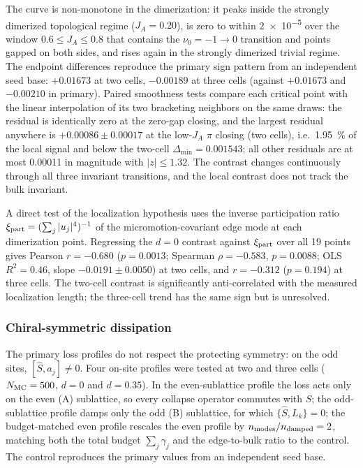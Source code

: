 \documentclass[aps,pra,preprint,superscriptaddress,amsmath,amssymb]{revtex4-2}
\begin{document}
The curve is non-monotone in the dimerization: it peaks inside the strongly dimerized topological regime ($J_A=\num{0.20}$), is zero to within \num{2e-5} over the window $\num{0.6}\le J_A\le\num{0.8}$ that contains the $\nu_0=-1\to0$ transition and points gapped on both sides, and rises again in the strongly dimerized trivial regime. The endpoint differences reproduce the primary sign pattern from an independent seed base: $+\num{0.01673}$ at two cells, $-\num{0.00189}$ at three cells (against $+\num{0.01673}$ and $-\num{0.00210}$ in primary). Paired smoothness tests compare each critical point with the linear interpolation of its two bracketing neighbors on the same draws: the residual is identically zero at the zero-gap closing, and the largest residual anywhere is $+\num{0.00086}\pm\num{0.00017}$ at the low-$J_A$ $\pi$ closing (two cells), i.e.\ \qty{1.95}{\percent} of the local signal and below the two-cell $\Delta_{\min}=\num{0.001543}$; all other residuals are at most \num{0.00011} in magnitude with $|z|\le\num{1.32}$. The contrast changes continuously through all three invariant transitions, and the local contrast does not track the bulk invariant.

A direct test of the localization hypothesis uses the inverse participation ratio $\xi_{\rm part}=(\sum_j|u_j|^4)^{-1}$ of the micromotion-covariant edge mode at each dimerization point. Regressing the $d=\num{0}$ contrast against $\xi_{\rm part}$ over all \num{19} points gives Pearson $r=\num{-0.680}$ ($p=\num{0.0013}$; Spearman $\rho=\num{-0.583}$, $p=\num{0.0088}$; OLS $R^2=\num{0.46}$, slope $-\num{0.0191}\pm\num{0.0050}$) at two cells, and $r=\num{-0.312}$ ($p=\num{0.194}$) at three cells. The two-cell contrast is significantly anti-correlated with the measured localization length; the three-cell trend has the same sign but is unresolved.

\subsubsection{Chiral-symmetric dissipation}
\label{sec:chiral-loss}

The primary loss profiles do not respect the protecting symmetry: on the odd sites, $[\hat S,a_j]\neq0$. Four on-site profiles were tested at two and three cells ($N_{\rm MC}=\num{500}$, $d=\num{0}$ and $d=\num{0.35}$). In the even-sublattice profile the loss acts only on the even (A) sublattice, so every collapse operator commutes with $\hat S$; the odd-sublattice profile damps only the odd (B) sublattice, for which $\{\hat S,L_k\}=0$; the budget-matched even profile rescales the even profile by $n_{\rm modes}/n_{\rm damped}=2$, matching both the total budget $\sum_j\gamma_j$ and the edge-to-bulk ratio to the control. The control reproduces the primary values from an independent seed base.
\end{document}
